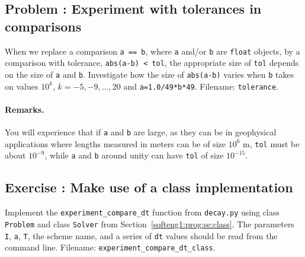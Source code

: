 \documentclass[%
oneside,                 %
final,                   %
10pt]{article}
\newenvironment{doconceexercise}{}{}
\newcounter{doconceexercisecounter}
\begin{document}
\begin{doconceexercise}

\subsection*{Problem \thedoconceexercisecounter: Experiment with tolerances in comparisons}

\label{softeng1:exer:tol}

When we replace a comparison \texttt{a == b}, where \texttt{a} and/or \texttt{b} are
\texttt{float} objects, by a comparison with tolerance, \texttt{abs(a-b) < tol},
the appropriate size of \texttt{tol} depends on the size of \texttt{a} and \texttt{b}.
Investigate how the size of \texttt{abs(a-b)} varies when \texttt{b} takes on
values $10^k$, $k=-5,-9,\ldots,20$ and \texttt{a=1.0/49*b*49}.
\noindent Filename: \texttt{tolerance}.


\paragraph{Remarks.}
You will experience that if \texttt{a} and \texttt{b} are large, as they can be
in geophysical applications where lengths measured in meters can be of size
$10^6$ m, \texttt{tol} must be about $10^{-9}$, while \texttt{a} and \texttt{b} around unity can
have \texttt{tol} of size $10^{-15}$.


\end{doconceexercise}




\begin{doconceexercise}

\subsection*{Exercise \thedoconceexercisecounter: Make use of a class implementation}

\label{softeng1:exer:class:dts}

Implement the \Verb!experiment_compare_dt! function from \texttt{decay.py}
using class \texttt{Problem} and class \texttt{Solver} from
Section~\ref{softeng1:prog:se:class}.
The parameters \texttt{I}, \texttt{a}, \texttt{T}, the scheme name, and a series of
\texttt{dt} values should be read from the command line.
\noindent Filename: \Verb!experiment_compare_dt_class!.

\end{doconceexercise}
\end{document}
